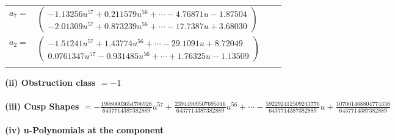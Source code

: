 \documentclass[1p]{elsarticle_modified}
\theoremstyle{definition}
\begin{document}
\begin{tabular}{m{7pt} m{180pt} m{7pt} m{180pt} }
\flushright $a_{7}=$&$\begin{pmatrix}-1.13256 u^{57}+0.211579 u^{56}+\cdots-4.76871 u-1.87504\\-2.01309 u^{57}+0.873239 u^{56}+\cdots-17.7387 u+3.68030\end{pmatrix}$ \\
\flushright $a_{2}=$&$\begin{pmatrix}-1.51241 u^{57}+1.43774 u^{56}+\cdots-29.1091 u+8.72049\\0.0761347 u^{57}-0.931485 u^{56}+\cdots+1.76325 u-1.13509\end{pmatrix}$\\&\end{tabular}
\flushleft \textbf{(ii) Obstruction class $= -1$}\\~\\
\flushleft \textbf{(iii) Cusp Shapes $= -\frac{19080003654706928}{6437714387382889} u^{57}+\frac{23944909507695016}{6437714387382889} u^{56}+\cdots-\frac{592292412509243776}{6437714387382889} u+\frac{107001468804774338}{6437714387382889}$}\\~\\
\newpage\renewcommand{\arraystretch}{1}
\flushleft \textbf{(iv) u-Polynomials at the component}\newline \\
\end{document}

